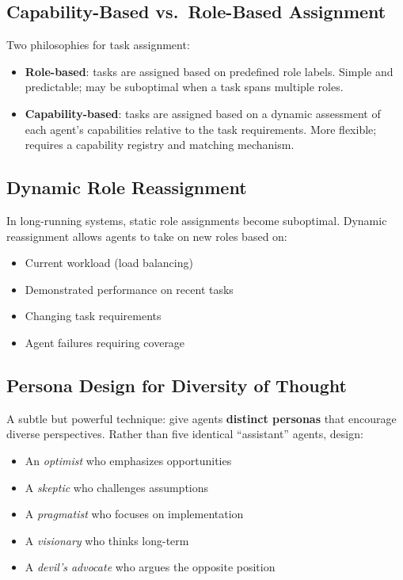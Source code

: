 \subsection{Capability-Based vs.~Role-Based Assignment}
\label{capability-based-vs.-role-based-assignment}

Two philosophies for task assignment:

\begin{itemize}
  \item \textbf{Role-based}: tasks are assigned based on predefined role labels. Simple and predictable; may be suboptimal when a task spans multiple roles.
  \item \textbf{Capability-based}: tasks are assigned based on a dynamic assessment of each agent’s capabilities relative to the task requirements. More flexible; requires a capability registry and matching mechanism.
\end{itemize}

\subsection{Dynamic Role Reassignment}
\label{dynamic-role-reassignment}

In long-running systems, static role assignments become suboptimal. Dynamic reassignment allows agents to take on new roles based on:

\begin{itemize}
  \item Current workload (load balancing)
  \item Demonstrated performance on recent tasks
  \item Changing task requirements
  \item Agent failures requiring coverage
\end{itemize}

\subsection{Persona Design for Diversity of Thought}
\label{persona-design-for-diversity-of-thought}

A subtle but powerful technique: give agents \textbf{distinct personas} that encourage diverse perspectives. Rather than five identical ``assistant'' agents, design:

\begin{itemize}
  \item An \emph{optimist} who emphasizes opportunities
  \item A \emph{skeptic} who challenges assumptions
  \item A \emph{pragmatist} who focuses on implementation
  \item A \emph{visionary} who thinks long-term
  \item A \emph{devil’s advocate} who argues the opposite position
\end{itemize}

